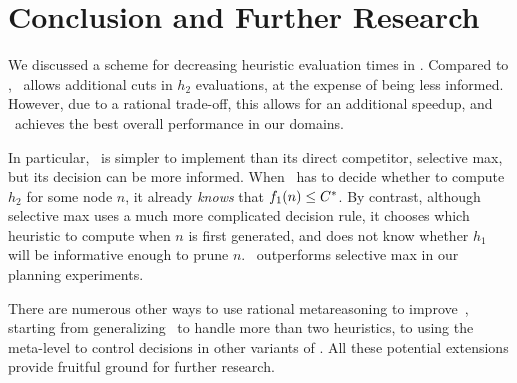\section{Conclusion and Further Research}

We discussed a scheme for decreasing heuristic evaluation
times in \lazyastar. Compared to \lazyastar, \rationallazyastar~allows
additional cuts in $h_2$ evaluations, at the expense of being less
informed. However, due to a rational trade-off, this
allows for an additional speedup, and \rationallazyastar~achieves the
best overall performance in our domains.

In particular, \rationallazyastar~is simpler to implement than its direct
competitor, selective max, but its decision can be more informed.  When
\rationallazyastar~has to decide whether to compute $h_2$ for some node
$n$, it already {\em knows} that $f_1(n) \leq C^\ast$.  By contrast,
although selective max uses a much more complicated decision rule, it
chooses which heuristic to compute when $n$ is first generated, and does
not know whether $h_1$ will be informative enough to prune $n$.
\rationallazyastar~outperforms selective max in our planning experiments.

There are numerous other ways to use rational metareasoning to
improve~\astar, starting from generalizing \rationallazyastar~to
handle more than two heuristics, to using the meta-level to control
decisions in other variants of \astar. All these potential extensions
provide fruitful ground for further research.
